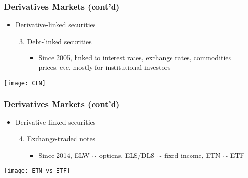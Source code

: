 \documentclass[10pt]{beamer}
\begin{document}
	\begin{frame}
		\frametitle{Derivatives Markets (cont'd)}
		
		\begin{itemize}
			
			\item Derivative-linked securities
			\begin{enumerate} \setcounter{enumi}{2}
				\item Debt-linked securities		
				\begin{itemize}
					\item Since 2005, linked to interest rates, exchange rates, commodities prices, etc, mostly for institutional investors
				\end{itemize} 			
			\end{enumerate}
			
		\end{itemize}
		
		\begin{center}
			\texttt{[image: CLN]} 			
		\end{center}	
		
	\end{frame}
	
	
	
	\begin{frame}
		\frametitle{Derivatives Markets (cont'd)}
		
		\begin{itemize}
			
			\item Derivative-linked securities
			\begin{enumerate} \setcounter{enumi}{3}
				\item Exchange-traded notes
				\begin{itemize}
					\item Since 2014, ELW $\sim$ options, ELS/DLS $\sim$ fixed income, ETN $\sim$ ETF
				\end{itemize} 
			\end{enumerate}
			
		\end{itemize}
		
		\begin{center}
			\texttt{[image: ETN\_vs\_ETF]} 
		\end{center}	
		
	\end{frame}
	
\end{document}
